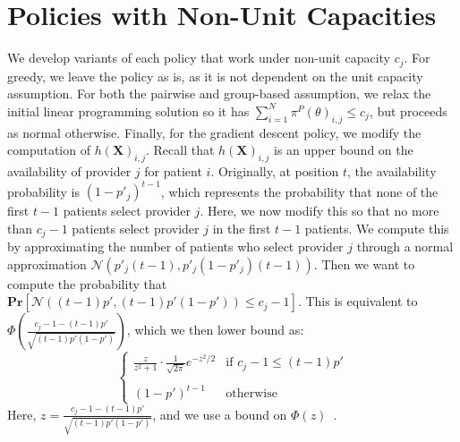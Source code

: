 \documentclass[11pt]{article}
\begin{document}
\section{Policies with Non-Unit Capacities}
\label{sec:non_unit_policies}
We develop variants of each policy that work under non-unit capacity $c_{j}$. 
For greedy, we leave the policy as is, as it is not dependent on the unit capacity assumption. 
For both the pairwise and group-based assumption, we relax the initial linear programming solution so it has $\sum_{i=1}^{N} \pi^{P}(\theta)_{i,j} \leq c_{j}$, but proceeds as normal otherwise. 
Finally, for the gradient descent policy, we modify the computation of $h(\mathbf{X})_{i,j}$. 
Recall that $h(\mathbf{X})_{i,j}$ is an upper bound on the availability of provider $j$ for patient $i$. 
Originally, at position $t$, the availability probability is $(1-p'_{j})^{t-1}$, which represents the probability that none of the first $t-1$ patients select provider $j$. 
Here, we now modify this so that no more than $c_{j}-1$ patients select provider $j$ in the first $t-1$ patients. 
We compute this by approximating the number of patients who select provider $j$ through a normal approximation $\mathcal{N}(p'_{j}(t-1),p'_{j}(1-p'_{j})(t-1))$. 
Then we want to compute the probability that $\mathbf{Pr}[\mathcal{N}((t-1)p',(t-1)p'(1-p')) \leq c_{j}-1]$.
This is equivalent to $\Phi(\frac{c_{j}-1-(t-1)p'}{\sqrt{(t-1)p'(1-p')}})$, which we then lower bound as: 
\begin{equation}
\left\{
\begin{array}{ll}
\displaystyle
\frac{z}{z^2 + 1} \cdot \frac{1}{\sqrt{2\pi}} e^{-z^2/2} & \text{if } c_{j} - 1 \leq (t - 1)p' \\\\
(1 - p')^{t - 1} & \text{otherwise}
\end{array}
\right.
\end{equation}
Here, $z = \frac{c_{j}-1-(t-1)p'}{\sqrt{(t-1)p'(1-p')}}$, and we use a bound on $\Phi(z)$~\citep{normal_bounds}. 
\end{document}
